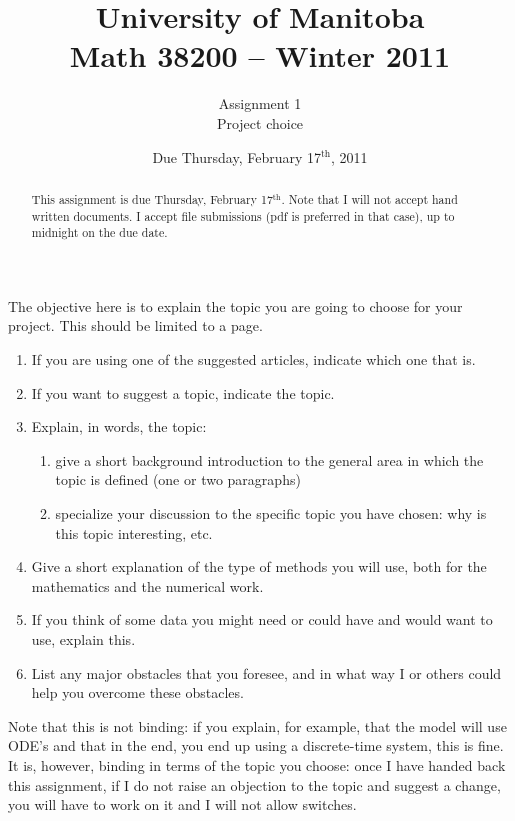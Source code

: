 \documentclass[12pt]{article}
\title{University of Manitoba\\ Math 38200 -- Winter 2011}
\author{Assignment 1\\ Project choice}
\date{Due Thursday, February 17$^\textrm{th}$, 2011}
\theoremstyle{plain}
\begin{document}
\maketitle
\begin{abstract}
This assignment is due Thursday, February 17$^\textrm{th}$. Note that I will not accept hand written documents. I accept file submissions (pdf is preferred in that case), up to midnight on the due date.
\end{abstract}
The objective here is to explain the topic you are going to choose for your project. This should be limited to a page.
\begin{enumerate}
\item If you are using one of the suggested articles, indicate which one that is.
\item If you want to suggest a topic, indicate the topic.
\item Explain, in words, the topic: 
\begin{enumerate}
\item give a short background introduction to the general area in which the topic is defined (one or two paragraphs)
\item specialize your discussion to the specific topic you have chosen: why is this topic interesting, etc.
\end{enumerate}
\item Give a short explanation of the type of methods you will use, both for the mathematics and the numerical work.
\item If you think of some data you might need or could have and would want to use, explain this.
\item List any major obstacles that you foresee, and in what way I or others could help you overcome these obstacles.
\end{enumerate}
Note that this is not binding: if you explain, for example, that the model will use ODE's and that in the end, you end up using a discrete-time system, this is fine. It is, however, binding in terms of the topic you choose: once I have handed back this assignment, if I do not raise an objection to the topic and suggest a change, you will have to work on it and I will not allow switches.
\end{document}
